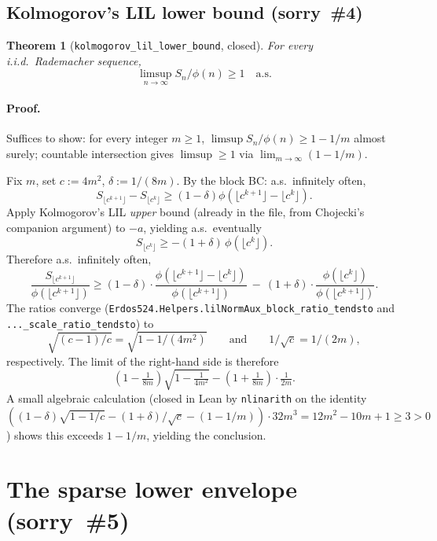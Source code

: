 \documentclass[11pt]{article}
\theoremstyle{plain}
\newtheorem{theorem}{Theorem}
\theoremstyle{definition}
\theoremstyle{remark}
\newcommand{\as}{\text{a.s.}}
\DeclareMathOperator*{\limsupop}{\limsup}
\begin{document}
\subsection{Kolmogorov's LIL lower bound (sorry~\#4)}

\begin{theorem}[\texttt{kolmogorov\_lil\_lower\_bound}, closed]
For every i.i.d.\ Rademacher sequence,
\[
  \limsupop_{n\to\infty} S_n / \phi(n) \ge 1 \quad \as
\]
\end{theorem}

\paragraph{Proof.} Suffices to show: for every integer $m\ge 1$,
$\limsup S_n/\phi(n) \ge 1 - 1/m$ almost surely; countable intersection
gives $\limsup \ge 1$ via $\lim_{m\to\infty}(1-1/m)$.

Fix $m$, set $c := 4m^2$, $\delta := 1/(8m)$. By the block BC:
a.s.\ infinitely often,
\[
  S_{\lfloor c^{k+1}\rfloor} - S_{\lfloor c^k\rfloor}
    \ge (1-\delta)\phi(\lfloor c^{k+1}\rfloor - \lfloor c^k\rfloor).
\]
Apply Kolmogorov's LIL \emph{upper} bound (already in the file,
from Chojecki's companion argument) to $-a$, yielding a.s.\
eventually
\[
  S_{\lfloor c^k\rfloor} \ge -(1+\delta)\,\phi(\lfloor c^k\rfloor).
\]
Therefore a.s.\ infinitely often,
\[
  \frac{S_{\lfloor c^{k+1}\rfloor}}{\phi(\lfloor c^{k+1}\rfloor)}
    \ge
    (1-\delta)\cdot
      \frac{\phi(\lfloor c^{k+1}\rfloor - \lfloor c^k\rfloor)}
           {\phi(\lfloor c^{k+1}\rfloor)}
    \ -\ (1+\delta)\cdot
      \frac{\phi(\lfloor c^k\rfloor)}{\phi(\lfloor c^{k+1}\rfloor)}.
\]
The ratios converge (\texttt{Erdos524.Helpers.lilNormAux\_block\_ratio\_tendsto}
and \texttt{...\_scale\_ratio\_tendsto}) to
\[
  \sqrt{(c-1)/c} = \sqrt{1 - 1/(4m^2)}
  \qquad\text{and}\qquad
  1/\sqrt c = 1/(2m),
\]
respectively. The limit of the right-hand side is therefore
\[
  (1-\tfrac1{8m})\sqrt{1 - \tfrac1{4m^2}} - (1+\tfrac1{8m})\cdot\tfrac{1}{2m}.
\]
A small algebraic calculation (closed in Lean by \texttt{nlinarith} on the
identity $((1-\delta)\sqrt{1-1/c} - (1+\delta)/\sqrt c - (1-1/m))\cdot 32m^3
= 12m^2 - 10m + 1 \ge 3 > 0$) shows this exceeds $1-1/m$, yielding the
conclusion.

\section{The sparse lower envelope (sorry~\#5)}
\end{document}
